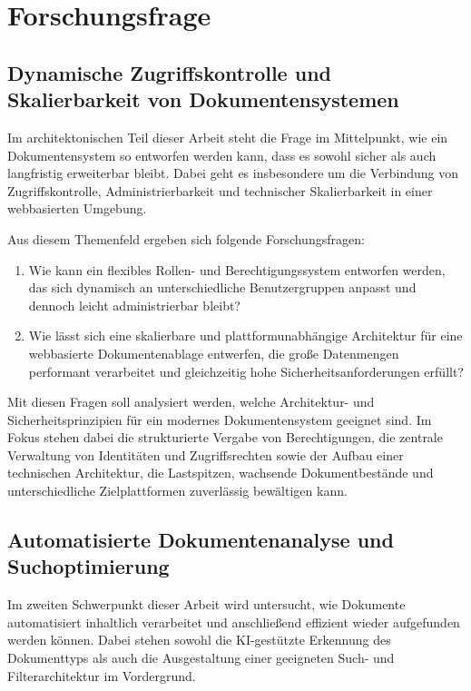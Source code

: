 \section{Forschungsfrage}\label{chapter:Forschungsfrage}
\subsection{Dynamische Zugriffskontrolle und Skalierbarkeit von Dokumentensystemen}\label{subsec:dynamische_zugriffskontrolle_und_skalierbarkeit}
Im architektonischen Teil dieser Arbeit steht die Frage im Mittelpunkt, wie ein Dokumentensystem so entworfen werden kann, dass es sowohl sicher als auch langfristig erweiterbar bleibt. Dabei geht es insbesondere um die Verbindung von Zugriffskontrolle, Administrierbarkeit und technischer Skalierbarkeit in einer webbasierten Umgebung.

Aus diesem Themenfeld ergeben sich folgende Forschungsfragen:
\begin{enumerate}
    \item Wie kann ein flexibles Rollen- und Berechtigungssystem entworfen werden, das sich dynamisch an unterschiedliche Benutzergruppen anpasst und dennoch leicht administrierbar bleibt?
    \item Wie lässt sich eine skalierbare und plattformunabhängige Architektur für eine webbasierte Dokumentenablage entwerfen, die große Datenmengen performant verarbeitet und gleichzeitig hohe Sicherheitsanforderungen erfüllt?
\end{enumerate}

Mit diesen Fragen soll analysiert werden, welche Architektur- und Sicherheitsprinzipien für ein modernes Dokumentensystem geeignet sind. Im Fokus stehen dabei die strukturierte Vergabe von Berechtigungen, die zentrale Verwaltung von Identitäten und Zugriffsrechten sowie der Aufbau einer technischen Architektur, die Lastspitzen, wachsende Dokumentbestände und unterschiedliche Zielplattformen zuverlässig bewältigen kann.

\subsection{Automatisierte Dokumentenanalyse und Suchoptimierung}\label{subsec:automatisierte_dokumentenanalyse_und_suchoptimierung}
Im zweiten Schwerpunkt dieser Arbeit wird untersucht, wie Dokumente automatisiert inhaltlich verarbeitet und anschließend effizient wieder aufgefunden werden können. Dabei stehen sowohl die KI-gestützte Erkennung des Dokumenttyps als auch die Ausgestaltung einer geeigneten Such- und Filterarchitektur im Vordergrund.

